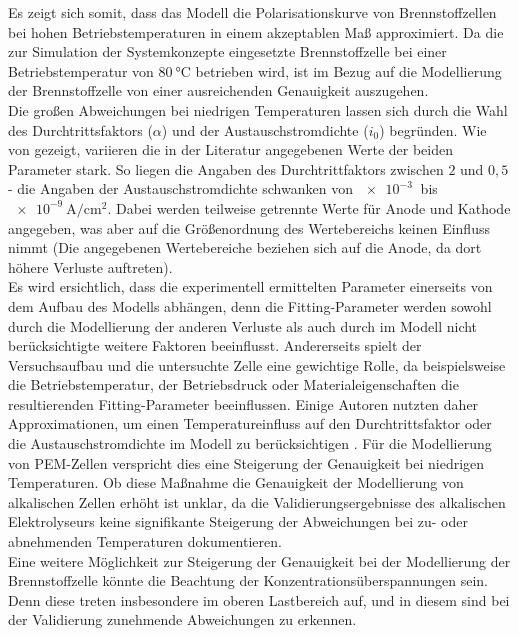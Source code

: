 Es zeigt sich somit, dass das Modell die Polarisationskurve von Brennstoffzellen bei hohen Betriebstemperaturen in einem akzeptablen Maß approximiert. Da die zur Simulation der Systemkonzepte eingesetzte Brennstoffzelle bei einer Betriebstemperatur von $\SI{80}{\degreeCelsius}$ betrieben wird, ist im Bezug auf die Modellierung der Brennstoffzelle von einer ausreichenden Genauigkeit auszugehen.\\
Die großen Abweichungen bei niedrigen Temperaturen lassen sich durch die Wahl des Durchtrittsfaktors ($\alpha$) und der Austauschstromdichte ($i_0$) begründen. Wie von \citet{falcao_review_2020} gezeigt, variieren die in der Literatur angegebenen Werte der beiden Parameter stark. So liegen die Angaben des Durchtrittfaktors zwischen $2$ und $0,5$ - die Angaben der Austauschstromdichte schwanken von $\SI{e-3}{}$ bis $\SI{e-9}{\A\per\cm\squared}$. Dabei werden teilweise getrennte Werte für Anode und Kathode angegeben, was aber auf die Größenordnung des Wertebereichs keinen Einfluss nimmt (Die angegebenen Wertebereiche beziehen sich auf die Anode, da dort höhere Verluste auftreten).\\
Es wird ersichtlich, dass die experimentell ermittelten Parameter einerseits von dem Aufbau des Modells abhängen, denn die Fitting-Parameter werden sowohl durch die Modellierung der anderen Verluste als auch durch im Modell nicht berücksichtigte weitere Faktoren beeinflusst. Andererseits spielt der Versuchsaufbau und die untersuchte Zelle eine gewichtige Rolle, da beispielsweise die Betriebstemperatur, der Betriebsdruck oder Materialeigenschaften die resultierenden Fitting-Parameter beeinflussen.
Einige Autoren nutzten daher Approximationen, um einen Temperatureinfluss auf den Durchtrittsfaktor oder die Austauschstromdichte im Modell zu berücksichtigen \citep{falcao_review_2020,milewski_modeling_2014}. Für die Modellierung von PEM-Zellen verspricht dies eine 
Steigerung der Genauigkeit bei niedrigen Temperaturen. Ob diese Maßnahme die Genauigkeit der Modellierung von alkalischen Zellen erhöht ist unklar, da die Validierungsergebnisse des alkalischen Elektrolyseurs keine signifikante Steigerung der Abweichungen bei zu- oder abnehmenden Temperaturen dokumentieren.\\
Eine weitere Möglichkeit zur Steigerung der Genauigkeit bei der Modellierung der Brennstoffzelle könnte die Beachtung der Konzentrationsüberspannungen sein. Denn diese treten insbesondere im oberen Lastbereich auf, und in diesem sind bei der Validierung zunehmende Abweichungen zu erkennen.\\

